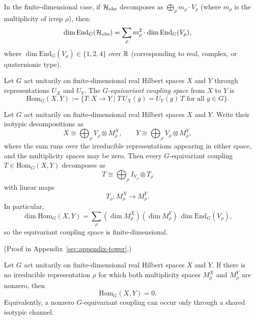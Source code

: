 \begin{corollary}
\label{cor:parameter-count}
In the finite-dimensional case, if $\mathcal{H}_{\mathrm{obs}}$ decomposes as $\bigoplus_\rho m_\rho \cdot V_\rho$ (where $m_\rho$ is the multiplicity of irrep $\rho$), then:
\[
\dim \mathrm{End}_G(\mathcal{H}_{\mathrm{obs}}) = \sum_\rho m_\rho^2 \cdot \dim \mathrm{End}_G(V_\rho),
\]
where $\dim \mathrm{End}_G(V_\rho) \in \{1, 2, 4\}$ over $\mathbb{R}$ (corresponding to real, complex, or quaternionic type).
\end{corollary}

\begin{definition}
\label{def:equivariant-coupling-space}
Let $G$ act unitarily on finite-dimensional real Hilbert spaces $X$ and $Y$
through representations $U_X$ and $U_Y$. The \emph{$G$-equivariant coupling
space} from $X$ to $Y$ is
\[
\mathrm{Hom}_G(X,Y):=
\{T:X\to Y \mid T\,U_X(g)=U_Y(g)\,T \text{ for all } g\in G\}.
\]
\end{definition}

\begin{theorem}
\label{thm:equivariant-coupling-decomposition}
Let $G$ act unitarily on finite-dimensional real Hilbert spaces $X$ and $Y$.
Write their isotypic decompositions as
\[
X\cong \bigoplus_{\rho} V_{\rho}\otimes M_{\rho}^X,
\qquad
Y\cong \bigoplus_{\rho} V_{\rho}\otimes M_{\rho}^Y,
\]
where the sum runs over the irreducible representations appearing in either
space, and the multiplicity spaces may be zero. Then every
$G$-equivariant coupling $T\in\mathrm{Hom}_G(X,Y)$ decomposes as
\[
T\cong \bigoplus_{\rho} I_{V_{\rho}}\otimes T_{\rho}
\]
with linear maps
\[
T_{\rho}:M_{\rho}^X\to M_{\rho}^Y.
\]
In particular,
\[
\dim \mathrm{Hom}_G(X,Y)
=
\sum_{\rho}
(\dim M_{\rho}^X)(\dim M_{\rho}^Y)\,\dim \mathrm{End}_G(V_{\rho}),
\]
so the equivariant coupling space is finite-dimensional.
\end{theorem}

(Proof in Appendix~\ref{sec:appendix-tower}.)

\begin{corollary}
\label{cor:equivariant-coupling-shared-channel}
Let $G$ act unitarily on finite-dimensional real Hilbert spaces $X$ and $Y$.
If there is no irreducible representation $\rho$ for which both multiplicity
spaces $M_\rho^X$ and $M_\rho^Y$ are nonzero, then
\[
\mathrm{Hom}_G(X,Y)=0.
\]
Equivalently, a nonzero $G$-equivariant coupling can occur only through a
shared isotypic channel.
\end{corollary}

